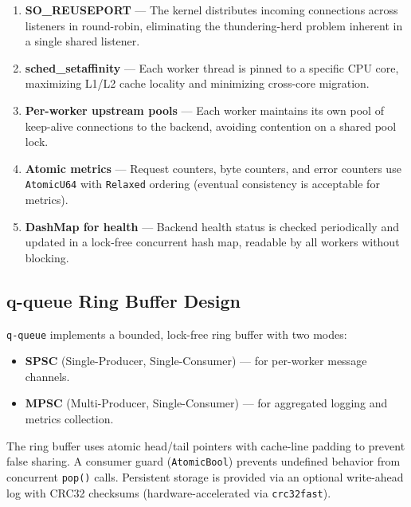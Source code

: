\documentclass[a4paper, 11pt]{article}
\newcommand{\qqueue}{\texttt{q-queue}}
\begin{document}
\begin{enumerate}[nosep]
  \item \textbf{SO\_REUSEPORT} --- The kernel distributes incoming
        connections across listeners in round-robin, eliminating the
        thundering-herd problem inherent in a single shared listener.
  \item \textbf{sched\_setaffinity} --- Each worker thread is pinned to
        a specific CPU core, maximizing L1/L2 cache locality and
        minimizing cross-core migration.
  \item \textbf{Per-worker upstream pools} --- Each worker maintains its
        own pool of keep-alive connections to the backend, avoiding
        contention on a shared pool lock.
  \item \textbf{Atomic metrics} --- Request counters, byte counters, and
        error counters use \texttt{AtomicU64} with \texttt{Relaxed}
        ordering (eventual consistency is acceptable for metrics).
  \item \textbf{DashMap for health} --- Backend health status is checked
        periodically and updated in a lock-free concurrent hash map,
        readable by all workers without blocking.
\end{enumerate}

\subsection{q-queue Ring Buffer Design}

\qqueue{} implements a bounded, lock-free ring buffer with two modes:

\begin{itemize}[nosep]
  \item \textbf{SPSC} (Single-Producer, Single-Consumer) --- for
        per-worker message channels.
  \item \textbf{MPSC} (Multi-Producer, Single-Consumer) --- for
        aggregated logging and metrics collection.
\end{itemize}

The ring buffer uses atomic head/tail pointers with cache-line padding
to prevent false sharing.  A consumer guard (\texttt{AtomicBool}) prevents
undefined behavior from concurrent \texttt{pop()} calls.  Persistent
storage is provided via an optional write-ahead log with CRC32 checksums
(hardware-accelerated via \texttt{crc32fast}).


\end{document}
